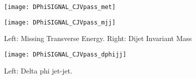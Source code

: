 \documentclass[a4paper,10pt]{article}
\begin{document}
\begin{figure}[!h]
\centering
\begin{minipage}[!h]{0.4\linewidth}
\centering
\texttt{[image: DPhiSIGNAL\_CJVpass\_met]}
\end{minipage}%
\begin{minipage}[!h]{0.4\linewidth}
\centering
\texttt{[image: DPhiSIGNAL\_CJVpass\_mjj]}
\end{minipage}
\caption{Left: Missing Transverse Energy. Right: Dijet Invariant Mass}
\end{figure}

\begin{figure}[!h]
\centering
\begin{minipage}[!h]{0.4\linewidth}
\centering
\texttt{[image: DPhiSIGNAL\_CJVpass\_dphijj]}
\end{minipage}%
\begin{minipage}[!h]{0.4\linewidth}
\centering
\end{minipage}
\caption{Left: Delta phi jet-jet.}
\end{figure}
\end{document}
